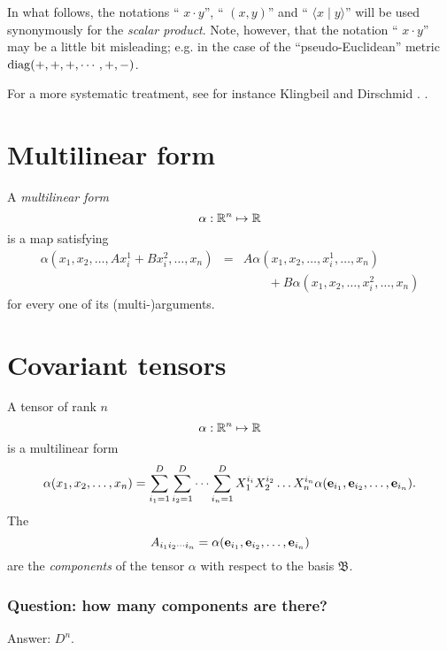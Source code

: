 In what follows, the notations
`` $x\cdot y$'',
`` $(x,y)$'' and
`` $\langle x\mid y\rangle $'' will be used synonymously for the {\em
scalar product}.
Note, however, that the notation `` $x\cdot y$''
may be a little bit misleading; e.g. in the case of the ``pseudo-Euclidean'' metric
 ${\rm diag}(+,+,+,\cdots ,+,-)$.

For a more systematic treatment, see for instance Klingbeil
\cite{Klingbeil}
and Dirschmid
\cite{Dirschmid}.
.


\section{Multilinear form}

A {\em multilinear form}
\begin{equation}
\alpha :{\Bbb R}^n \mapsto {\Bbb R}
\end{equation}
is a map satisfying
\begin{eqnarray}
\alpha ( x_1,x_2,\ldots , A x^1_i+ B x^2_i,\ldots ,x_n)
&=&
A\alpha ( x_1,x_2,\ldots , x^1_i,\ldots ,x_n) \nonumber \\
&&  \qquad +
B\alpha ( x_1,x_2,\ldots , x^2_i,\ldots ,x_n)
\end{eqnarray}
for every one of its (multi-)arguments.


\section{Covariant tensors}
A tensor of rank $n$
\begin{equation}
\alpha:{\Bbb R}^n \mapsto {\Bbb R}
\end{equation}
is a multilinear form
\begin{equation}
\alpha ( x_1,x_2,\ldots ,x_n)=
\sum_{i_1=1}^D
\sum_{i_2=1}^D
\cdots
\sum_{i_n=1}^D
X^{i_i}_1 X^{i_2}_2\ldots X^{i_n}_n
\alpha ( {\bf e}_{i_1},{\bf e}_{i_2},\ldots ,{\bf e}_{i_n}).
\end{equation}
The
\begin{equation}
A_{{i_1}{i_2}\cdots {i_n}}=\alpha ( {\bf e}_{i_1},{\bf e}_{i_2},\ldots ,{\bf e}_{i_n})
\end{equation}
 are the
{\em components} of the tensor $\alpha $ with respect to the basis
${\mathfrak B}$.

\subsubsection{Question: how many components are there?}
{Answer: $D^n$.}

